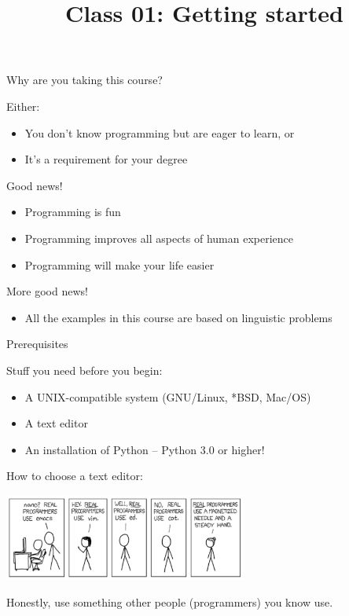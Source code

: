 \documentclass[10pt, compress]{beamer}
\title{Class 01: Getting started }
\begin{document}
\maketitle

\begin{frame}{Why are you taking this course?}

Either:
\begin{itemize}
  \item You don't know programming but are eager to learn, or
  \item It's a requirement for your degree
\end{itemize}

Good news!
\begin{itemize}
  \item Programming is fun
  \item Programming improves all aspects of human experience
  \item Programming will make your life easier
\end{itemize}

More good news! 
\begin{itemize}
  \item All the examples in this course are based on linguistic problems
\end{itemize}

\end{frame}

\begin{frame}{Prerequisites}

Stuff you need before you begin:
\begin{itemize}
 \item A UNIX-compatible system (GNU/Linux, *BSD, Mac/OS)
 \item A text editor
 \item An installation of Python -- Python 3.0 or higher!
\end{itemize}

How to choose a text editor:

\begin{center}
  \includegraphics[width=0.6\textwidth]{graphics/realprogrammers.png}
\end{center}

Honestly, use something other people (programmers) you know use.

\end{frame}
\end{document}
